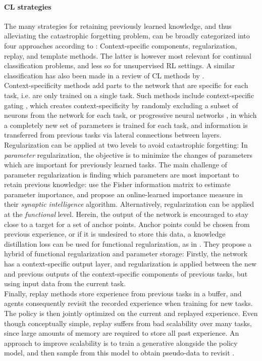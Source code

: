 \documentclass[dvipsnames]{article} %
\newcommand{\comment}[1]{}
\newcommand{\as}[1] {\comment{{\color{orange} AS: #1}}}              %
\begin{document}
\paragraph{CL strategies} The many strategies for retaining previously learned knowledge, and thus alleviating the catastrophic forgetting problem, can be broadly categorized into four approaches according to \citet{threescenarios2}: Context-specific components, regularization, replay, and template methods. The latter is however most relevant for continual classification problems, and less so for unsupervised RL settings. A similar classification has also been made in a review of CL methods by \citet{towardsCRL}.\\
Context-specificity methods add parts to the network that are specific for each task, i.e. are only trained on a single task. Such methods include context-specific gating \citep{xdg}, which creates context-specificity by randomly excluding a subset of neurons from the network for each task, or progressive neural networks \citep{pnn}, in which a completely new set of parameters is trained for each task, and information is transferred from previous tasks via lateral connections between layers.\\
Regularization can be applied at two levels to avoid catastrophic forgetting: In \textit{parameter} regularization, the objective is to minimize the changes of parameters which are important for previously learned tasks. The main challenge of parameter regularization is finding which parameters are most important to retain previous knowledge: \citet{ewc} use the Fisher information matrix to estimate parameter importance, and \citet{synapticintelligence} propose an online-learned importance measure in their \textit{synaptic intelligence} algorithm. Alternatively, regularization can be applied at the \textit{functional} level. Herein, the output of the network is encouraged to stay close to a target for a set of anchor points. Anchor points could be chosen from previous experience, or if it is undesired to store this data, a knowledge distillation loss can be used for functional regularization, as in \citet{lwf}. They propose a hybrid of functional regularization and parameter storage: \as{ok, and?. Make sure that what you write is informative} Firstly, the network has a context-specific output layer, and regularization is applied between the new and previous outputs of the context-specific components of previous tasks, but using input data from the current task.\\
Finally, replay methods store experience from previous tasks in a buffer, and agents consequently revisit the recorded experience when training for new tasks. The policy is then jointly optimized on the current and replayed experience. Even though conceptually simple, replay suffers from bad scalability over many tasks, since large amounts of memory are required to store all past experience. An approach to improve scalability is to train a generative alongside the policy model, and then sample from this model to obtain pseudo-data to revisit \citep{generativeReplay}.
\end{document}
